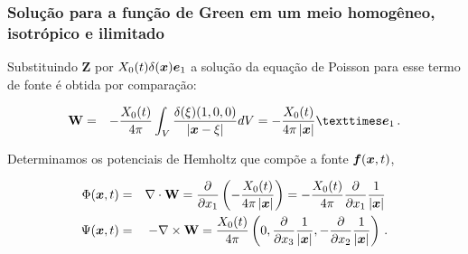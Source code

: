 \documentclass{beamer}
\newcommand{\xvec}{\vc{x}}
\newcommand{\evec}{\vc{e}}
\newcommand{\fvec}{\vc{f}}
\newcommand{\xivec}{\boldmath \xi}
\begin{document}
\begin{frame}
	\frametitle{\textbf{Solu\c{c}\~ao para a fun\c{c}\~ao de Green em um meio homog\^eneo, isotr\'opico e ilimitado}}
	
	\begin{flushleft}
		Substituindo $\mathbf{Z}$ por $X_{0}(t)\delta(\xvec)\evec_1$ a solu\c{c}\~ao da equa\c{c}\~ao de Poisson 
		para esse termo de fonte \'e obtida por compara\c{c}\~ao:
	\end{flushleft}
	\begin{eqnarray}
	\label{ten1}
	\mathbf{W} &=& - \frac{X_{0}(t)}{4\pi} \int_{V} \frac{\delta(\xivec) (1,0,0)}{\left| \xvec - \xivec \right|} dV =  - \frac{X_{0}(t)}{4\pi\left| \xvec \right|}{×} \evec_1\,  .
	\end{eqnarray}
	\begin{flushleft}
		Determinamos os potenciais de Hemholtz que comp\~oe a fonte $\fvec(\xvec,t)$,    
	\end{flushleft}
	\begin{eqnarray}
	\label{ten1}
	\Phi(\xvec,t) &=& \nabla \cdot \mathbf{W} = \frac{\partial }{\partial x_1} \left( -\frac{X_{0}(t)}{4\pi\left| \xvec \right|} \right) = - \frac{X_{0}(t)}{4\pi} \frac{\partial }{\partial x_1} \frac{1}{\left| \xvec \right|} \, \\ 
	\Psi(\xvec,t) &=& - \nabla \times \mathbf{W} =  \frac{X_{0}(t)}{4\pi}\left(0, \frac{\partial }{\partial x_3}  \frac{1}{\left| \xvec \right|},-\frac{\partial }{\partial x_2} \frac{1}{\left| \xvec \right|}  \right)\, .
	\end{eqnarray}
	
\end{frame}%
\end{document}
